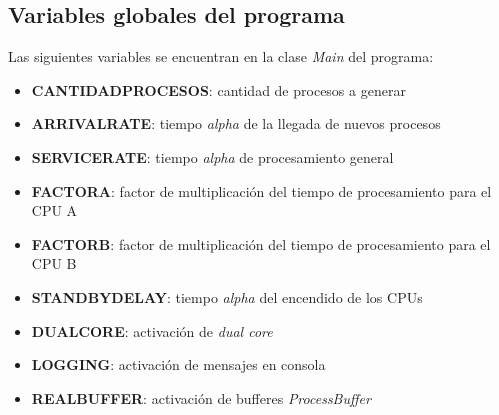 \documentclass{article}
\begin{document}
    \subsection{Variables globales del programa} \noindent
    Las siguientes variables se encuentran en la clase \emph{Main} del programa:
    \begin{itemize}
        \item \textbf{CANTIDADPROCESOS}: cantidad de procesos a generar 
        \item \textbf{ARRIVALRATE}: tiempo \emph{alpha} de la llegada de nuevos procesos
        \item \textbf{SERVICERATE}: tiempo \emph{alpha} de procesamiento general
        \item \textbf{FACTORA}: factor de multiplicación del tiempo de procesamiento para el
        CPU A
        \item \textbf{FACTORB}: factor de multiplicación del tiempo de procesamiento para el
        CPU B
        \item \textbf{STANDBYDELAY}: tiempo \emph{alpha} del encendido de los CPUs
        \item \textbf{DUALCORE}: activación de \emph{dual core}
        \item \textbf{LOGGING}: activación de mensajes en consola
        \item \textbf{REALBUFFER}: activación de bufferes \emph{ProcessBuffer}
    \end{itemize}
\end{document}
